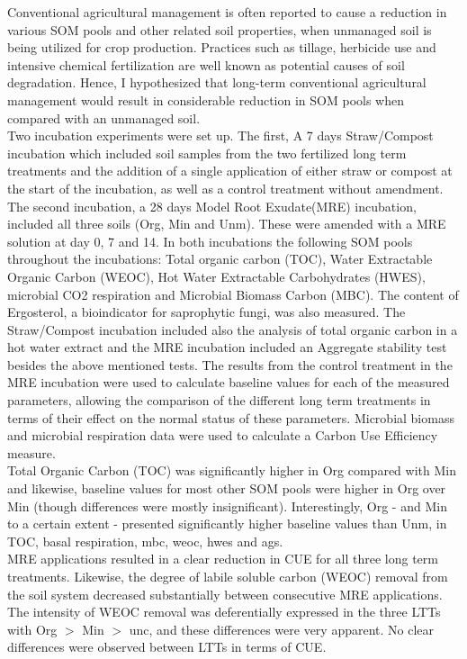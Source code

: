 	Conventional agricultural management is often reported to cause a reduction in various SOM pools and other related soil properties, when unmanaged soil is being utilized for crop production. Practices such as tillage, herbicide use and intensive chemical fertilization are well known as potential causes of soil degradation. Hence, I hypothesized that long-term conventional agricultural management would result in considerable reduction in SOM pools when compared with an unmanaged soil.\\
	Two incubation experiments were set up. The first, A 7 days Straw/Compost incubation which included soil samples from the two fertilized long term treatments and the addition of a single application of either straw or compost at the start of the incubation, as well as a control treatment without amendment. The second incubation, a 28 days Model Root Exudate(MRE) incubation, included all three soils (Org, Min and Unm). These were amended with a MRE solution at day 0, 7 and 14. In both incubations the following SOM pools throughout the incubations: Total organic carbon (TOC), Water Extractable Organic Carbon (WEOC), Hot Water Extractable Carbohydrates (HWES), microbial CO2 respiration and Microbial Biomass Carbon (MBC). The content of Ergosterol, a bioindicator for saprophytic fungi, was also measured. The Straw/Compost incubation included also the analysis of total organic carbon in a hot water extract and the MRE incubation included an Aggregate stability test besides the above mentioned tests.  The results from the control treatment in the MRE incubation were used to calculate baseline values for each of the measured parameters, allowing the comparison of the different long term treatments in terms of their effect on the normal status of these parameters. Microbial biomass and microbial respiration data were used to calculate a Carbon Use Efficiency measure.\\
	Total Organic Carbon (TOC) was significantly higher in Org compared with Min and likewise, baseline values  for most other SOM pools were higher in Org over Min (though differences were mostly insignificant). Interestingly, Org - and Min to a certain extent - presented significantly higher baseline values than Unm, in TOC, basal respiration, \gls{mbc}, \gls{weoc}, \gls{hwes} and \gls{ags}.\\ 
	MRE applications resulted in a clear reduction in CUE for all three long term treatments. Likewise, the degree of labile soluble carbon (WEOC) removal from the soil system decreased substantially between consecutive MRE applications. The intensity of WEOC removal was deferentially expressed in the three LTTs with Org $  > $ Min $ > $ \gls{unc}, and these differences were very apparent. No clear differences were observed between LTTs in terms of CUE.\\
